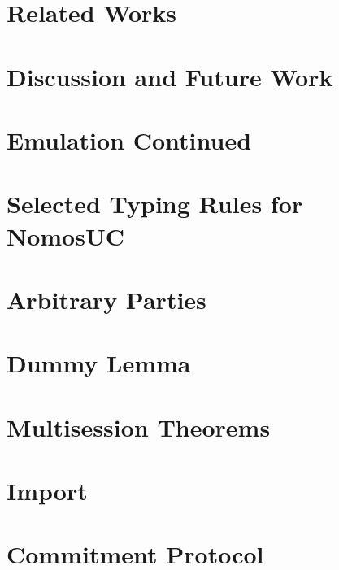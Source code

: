\documentclass[conference]{IEEEtran}
\begin{document}
\section{Related Works} \label{sec:related}


\section{Discussion and Future Work}





\newpage


\appendices

\section{Emulation Continued} \label{app:emulation}


\section{Selected Typing Rules for NomosUC} \label{app:typing_rules}


\section{Arbitrary Parties} \label{app:arbparties}


\section{Dummy Lemma} \label{app:dummy}


\section{Multisession Theorems} \label{app:ms}


\section{Import} \label{app:import}


\section{Commitment Protocol} \label{app:protcom}

\end{document}
